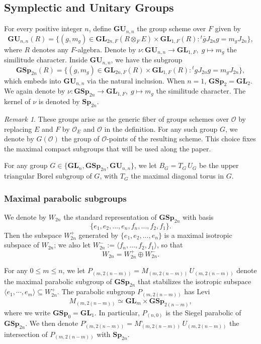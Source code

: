 \documentclass[11pt, reqno]{amsart}
\theoremstyle{plain}
\theoremstyle{definition}
\theoremstyle{remark}
\newtheorem{remark}[theorem]{Remark}
\theoremstyle{plain}
\def\GSp{{\mathbf{GSp}}}
\def\Sp{{\mathbf{Sp}}}
\def\GU{{\mathbf{GU}}}
\def\GL{\mathbf{GL}}
\begin{document}
\subsection{Symplectic and Unitary Groups}\label{sec:groups} 
For every positive integer $n$, define $\GU_{n,n}$ the group scheme over $F$ given by  
\[ \GU_{n,n}(R) = \{ (g,m_g) \in \GL_{2n,F}(R \otimes_{F}  E ) \times \GL_{1,F}(R) :{}^t\bar{g} J_{2n} g = m_g J_{2n}\}, \]
where $R$ denotes any $F$-algebra.  Denote by $\nu:\GU_{n,n} \to \GL_{1,F}, \; g \mapsto m_g$ the similitude character. Inside $\GU_{n,n}$, we have the subgroup \[\GSp_{2n}(R)=\{ (g,m_g) \in \GL_{2n,F}(R) \times \GL_{1,F}(R) :{}^tg J_{2n} g = m_g J_{2n}\}, \]
which embeds into $\GU_{n,n}$ via the natural inclusion. When $n=1$, $\GSp_{2} = \GL_2$. We again denote by $\nu : \GSp_{2n} \to \GL_{1,F}, \; g \mapsto m_g$ the similitude character. The kernel of $\nu$ is denoted by $\Sp_{2n}$. 
\begin{remark}
    
These groups arise as the generic fiber of groups schemes over $\mathcal{O}$ by replacing $E$ and $F$ by $\mathcal{O}_E$ and $\mathcal{O}$ in the definition. For any such group $G$, we denote by $G(\mathcal{O})$ the group of $\mathcal{O}$-points of the resulting scheme. This choice fixes the maximal compact subgroups that will be used along the paper. 
\end{remark}

For any group $G \in \{\GL_n, \GSp_{2n}, \GU_{n,n}\}$, we let $B_G = T_G \, U_G$ be the upper triangular Borel subgroup of $G$, with $T_G$ the maximal diagonal torus in $G$.

\subsubsection{Maximal parabolic subgroups}\label{subsec:Parabolics:GSp}

We denote by $W_{2n}$ the standard representation of $\GSp_{2n}$ with basis 
  $$\{e_1,e_2,\dots ,e_n,f_n, \dots ,f_2,f_1\}.$$ 
Then the subspace $W_{2n}^+$ generated by $\{e_1,e_2,\dots ,e_n\}$ is a maximal isotropic subspace of $W_{2n}$; we also let $W_{2n}^- := \langle f_n, \dots ,f_2,f_1 \rangle$, so that $$W_{2n} = W_{2n}^+ \oplus W_{2n}^- .$$  

For any $0 \leq m \leq n $, we let  $P_{(m, 2(n-m))} = M_{(m, 2(n-m))} \, U_{(m, 2(n-m))}$ denote the maximal parabolic subgroup of $\GSp_{2n}$ that stabilizes the isotropic subspace $\langle e_1, \cdots, e_m \rangle \subseteq  W_{2n}^+ .$ The parabolic subgroup $P_{(m, 2(n-m))}$ has Levi $$ M_{(m, 2(n-m))} \simeq \GL_m \times \GSp_{2(n-m)},$$ 
where we write $\GSp_{0} = \GL_1$. In particular, $P_{(n,0)}$ is the Siegel parabolic of $\GSp_{2n}$. We then denote $P_{(m, 2(n-m))}^\circ = M_{(m, 2(n-m))}^\circ \, U_{(m, 2(n-m))}$ the intersection of $P_{(m, 2(n-m))}$ with $\Sp_{2n}$. 
\end{document}
